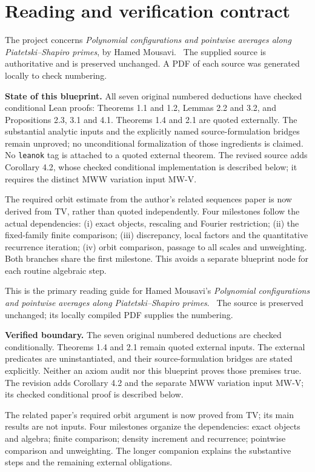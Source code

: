 \section*{Reading and verification contract}
\ifDetailed
The project concerns \emph{Polynomial configurations and pointwise averages along Piatetski--Shapiro primes}, by Hamed Mousavi. \versionnote\ The supplied source is authoritative and is preserved unchanged. A PDF of each source was generated locally to check numbering.

\textbf{State of this blueprint.} All seven original numbered deductions have checked conditional Lean proofs: Theorems 1.1 and 1.2, Lemmas 2.2 and 3.2, and Propositions 2.3, 3.1 and 4.1. Theorems 1.4 and 2.1 are quoted externally. The substantial analytic inputs and the explicitly named source-formulation bridges remain unproved; no unconditional formalization of those ingredients is claimed. No \texttt{leanok} tag is attached to a quoted external theorem. The revised source adds Corollary 4.2, whose checked conditional implementation is described below; it requires the distinct MWW variation input MW-V.

The required orbit estimate from the author's related sequences paper is now derived from TV, rather than quoted independently. Four milestones follow the actual dependencies: (i) exact objects, rescaling and Fourier restriction; (ii) the fixed-family finite comparison; (iii) discrepancy, local factors and the quantitative recurrence iteration; (iv) orbit comparison, passage to all scales and unweighting. Both branches share the first milestone. This avoids a separate blueprint node for each routine algebraic step.

\else
This is the primary reading guide for Hamed Mousavi's \emph{Polynomial configurations and pointwise averages along Piatetski--Shapiro primes}. \versionnote\ The source is preserved unchanged; its locally compiled PDF supplies the numbering.

\textbf{Verified boundary.} The seven original numbered deductions are checked conditionally. Theorems 1.4 and 2.1 remain quoted external inputs. The external predicates are uninstantiated, and their source-formulation bridges are stated explicitly. Neither an axiom audit nor this blueprint proves those premises true. The revision adds Corollary 4.2 and the separate MWW variation input MW-V; its checked conditional proof is described below.

The related paper's required orbit argument is now proved from TV; its main results are not inputs. Four milestones organize the dependencies: exact objects and algebra; finite comparison; density increment and recurrence; pointwise comparison and unweighting. The longer companion explains the substantive steps and the remaining external obligations.
\fi

